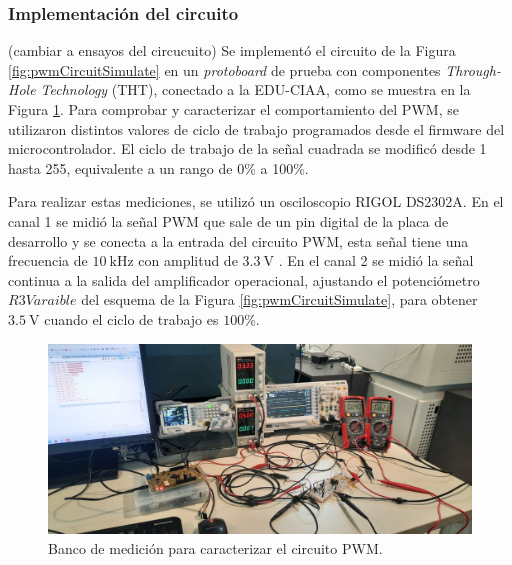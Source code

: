 \subsubsection{Implementación del circuito}
(cambiar a ensayos del circucuito)
Se implementó el circuito de la Figura \ref{fig:pwmCircuitSimulate} en un \textit{protoboard} de prueba con componentes \textit{Through-Hole Technology} (THT), conectado a la EDU-CIAA, como se muestra en la Figura \ref{fig:BancoMedicion1}. Para comprobar y caracterizar el comportamiento del PWM, se utilizaron distintos valores de ciclo de trabajo programados desde el firmware del microcontrolador. El ciclo de trabajo de la señal cuadrada se modificó desde 1 hasta 255, equivalente a un rango de 0\% a 100\%.

Para realizar estas mediciones, se utilizó un osciloscopio RIGOL DS2302A. En el canal 1 se midió la señal PWM que sale de un pin digital de la placa de desarrollo y se conecta a la entrada del circuito PWM, esta señal tiene una frecuencia de $\SI{10}{\kilo\hertz}$ con amplitud de $\SI{3.3}{\volt}$ . En el canal 2 se midió la señal continua a la salida del amplificador operacional, ajustando el potenciómetro $R3Varaible$ del esquema de la Figura \ref{fig:pwmCircuitSimulate}, para obtener $\SI{3.5}{\volt}$ cuando el ciclo de trabajo es $100\%$.


\begin{figure}[H]
    \centering
    \includegraphics[width=1\linewidth]{Figuras/datalogger/Hardware/BancoMedicion1.jpg}
    \caption{Banco de medición para caracterizar el circuito PWM.}
    \label{fig:BancoMedicion1}
\end{figure}

